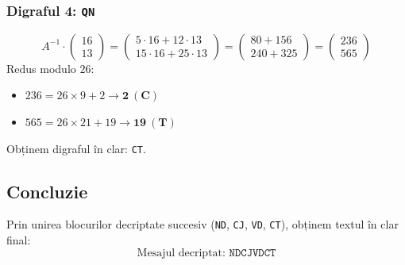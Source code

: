 \documentclass[12pt]{article}
\begin{document}
\subsubsection*{Digraful 4: \texttt{QN}}
\[
A^{-1} \cdot \begin{pmatrix} 16 \\ 13 \end{pmatrix} = \begin{pmatrix} 5 \cdot 16 + 12 \cdot 13 \\ 15 \cdot 16 + 25 \cdot 13 \end{pmatrix} = \begin{pmatrix} 80 + 156 \\ 240 + 325 \end{pmatrix} = \begin{pmatrix} 236 \\ 565 \end{pmatrix}
\]
Redus modulo $26$:
\begin{itemize}
    \item $236 = 26 \times 9 + 2 \rightarrow \mathbf{2 \ (C)}$
    \item $565 = 26 \times 21 + 19 \rightarrow \mathbf{19 \ (T)}$
\end{itemize}
Obținem digraful în clar: \texttt{CT}.

\subsection*{Concluzie}
Prin unirea blocurilor decriptate succesiv (\texttt{ND}, \texttt{CJ}, \texttt{VD}, \texttt{CT}), obținem textul în clar final:
\[
\text{Mesajul decriptat: } \mathbf{\texttt{NDCJVDCT}}
\]
\end{document}
